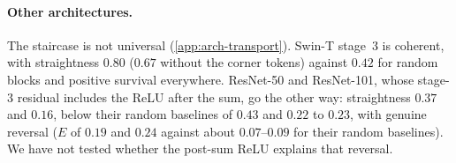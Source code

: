 \paragraph{Other architectures.}
The staircase is not universal (\cref{app:arch-transport}).
Swin-T stage~3 is coherent, with straightness $0.80$ ($0.67$ without the corner
tokens) against $0.42$ for random blocks and positive survival everywhere.
ResNet-50 and ResNet-101, whose stage-3 residual includes the ReLU after the sum, go the
other way: straightness $0.37$ and $0.16$, below their random baselines of $0.43$ and
$0.22$ to $0.23$, with genuine reversal ($E$ of $0.19$ and $0.24$ against about
$0.07$--$0.09$ for their random baselines).
We have not tested whether the post-sum ReLU explains that reversal.
